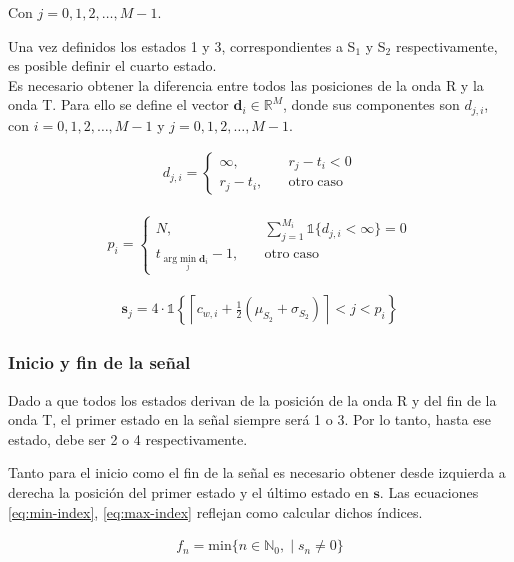\indent Con $j=0,1,2,\dots,M-1$. \bigskip

\indent Una vez definidos los estados 1 y 3, correspondientes a S$_1$ y S$_2$ respectivamente, es posible definir el
cuarto estado. \\
\indent Es necesario obtener la diferencia entre todos las posiciones de la onda R y la onda T. Para ello se define
el vector $\mathbf{d}_i \in \mathbb{R}^M$, donde sus componentes son $d_{j,i}$, con $i = 0,1,2,\dots,M-1$ y $j = 0,
1,2,\dots,M-1$.

\begin{align}
  d_{j,i} = \begin{cases}
    \infty, \qquad &r_j - t_i < 0 \\
    r_j - t_i, \quad &\mathrm{otro \; caso}
  \end{cases}
\end{align}


\begin{align}
  p_i = \begin{cases}
    N, \quad &\sum_{j=1}^{M_i} \mathds{1}\big\{d_{j,i} < \infty\big\} =  0  \\
    t_{\arg \underset{j}{\mathrm{min}} \; \mathbf{d}_i} -1, \quad  & \mathrm{otro \; caso}
  \end{cases}
\end{align}

\begin{align}
  \mathbf{s}_j = 4 \cdot \mathds{1}\left\{\left\lceil c_{w,i} + \frac{1}{2}(\mu_{S_2} + \sigma_{S_2}) \right\rceil <
  j < p_i  \right\}
\end{align}

\subsubsection*{Inicio y fin de la señal}

\indent Dado a que todos los estados derivan de la posición de la onda R y del fin de la onda T, el primer estado en
la señal siempre será 1 o 3. Por lo tanto, hasta ese estado, debe ser 2 o 4 respectivamente.

\indent Tanto para el inicio como el fin de la señal es necesario obtener desde izquierda a derecha la posición del
primer estado y el último estado en $\mathbf{s}$. Las ecuaciones \ref{eq:min-index}, \ref{eq:max-index} reflejan
como calcular dichos índices.

\begin{align} \label{eq:min-index}
  f_n = \mathrm{min}\big\{ n \in \mathbb{N}_0, \; | \; s_n \neq 0  \big\}
\end{align}

